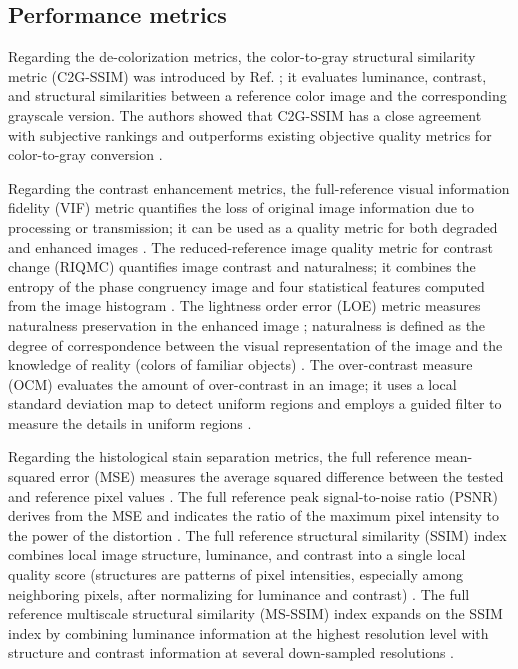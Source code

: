 \documentclass[superscriptaddress,longbibliography,aps,prl,twocolumn,10pt]{revtex4-2}
\begin{document}
\subsection*{\normalsize{Performance metrics}}
Regarding the de-colorization metrics, the color-to-gray structural similarity metric (C2G-SSIM) was introduced by Ref. \cite{Ma2015}; it evaluates luminance, contrast, and structural similarities between a reference color image and the corresponding grayscale version. The authors showed that C2G-SSIM has a close agreement with subjective rankings and outperforms existing objective quality metrics for color-to-gray conversion \cite{Ma2015}.

Regarding the contrast enhancement metrics, the full-reference \cite{Wang2006} visual information fidelity (VIF) metric quantifies the loss of original image information due to processing or transmission; it can be used as a quality metric for both degraded and enhanced images \cite{Sheikh2006, Qureshi2017}. The reduced-reference \cite{Wang2011} image quality metric for contrast change (RIQMC) quantifies image contrast and naturalness; it combines the entropy of the phase congruency image and four statistical features computed from the image histogram \cite{Gu2016, Qureshi2017}. The lightness order error (LOE) metric measures naturalness preservation in the enhanced image \cite{Wang2013, Qureshi2017}; naturalness is defined as the degree of correspondence between the visual representation of the image and the knowledge of reality (colors of familiar objects) \cite{Qureshi2017}. The over-contrast measure (OCM) evaluates the amount of over-contrast in an image; it uses a local standard deviation map to detect uniform regions and employs a guided filter \cite{He2013} to measure the details in uniform regions \cite{Lee2019}.

Regarding the histological stain separation metrics, the full reference mean-squared error (MSE) measures the average squared difference between the tested and reference pixel values \cite{matlab_toolbox_ref}. The full reference peak signal-to-noise ratio (PSNR) derives from the MSE and indicates the ratio of the maximum pixel intensity to the power of the distortion \cite{matlab_toolbox_ref}. The full reference structural similarity (SSIM) index combines local image structure, luminance, and contrast into a single local quality score (structures are patterns of pixel intensities, especially among neighboring pixels, after normalizing for luminance and contrast) \cite{matlab_toolbox_ref}. The full reference multiscale structural similarity (MS-SSIM) index expands on the SSIM index by combining luminance information at the highest resolution level with structure and contrast information at several down-sampled resolutions \cite{matlab_toolbox_ref}.
\end{document}
